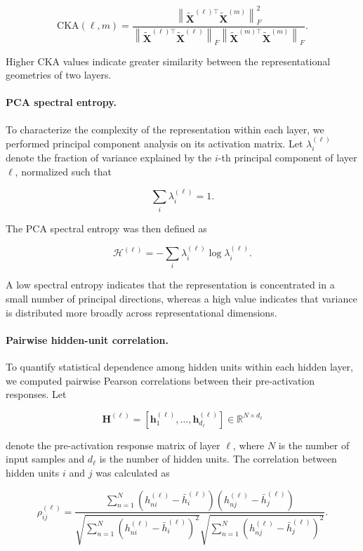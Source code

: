 \documentclass{article}
\begin{document}
\[
\mathrm{CKA}(\ell,m)
=
\frac{
\left\|
\tilde{\mathbf{X}}^{(\ell)\top}
\tilde{\mathbf{X}}^{(m)}
\right\|_F^2
}{
\left\|
\tilde{\mathbf{X}}^{(\ell)\top}
\tilde{\mathbf{X}}^{(\ell)}
\right\|_F
\left\|
\tilde{\mathbf{X}}^{(m)\top}
\tilde{\mathbf{X}}^{(m)}
\right\|_F
}.
\]

Higher CKA values indicate greater similarity between the representational geometries of two layers.

\paragraph{PCA spectral entropy.}
To characterize the complexity of the representation within each layer, we performed principal component analysis on its activation matrix. Let $\lambda_i^{(\ell)}$ denote the fraction of variance explained by the $i$-th principal component of layer $\ell$, normalized such that

\[
\sum_i \lambda_i^{(\ell)} = 1.
\]

The PCA spectral entropy was then defined as

\[
\mathcal{H}^{(\ell)}
=
-\sum_i
\lambda_i^{(\ell)}
\log \lambda_i^{(\ell)}.
\]

A low spectral entropy indicates that the representation is concentrated in a small number of principal directions, whereas a high value indicates that variance is distributed more broadly across representational dimensions.

\paragraph{Pairwise hidden-unit correlation.}
To quantify statistical dependence among hidden units within each hidden layer, we computed pairwise Pearson correlations between their pre-activation responses. Let

\[
\mathbf{H}^{(\ell)}
=
\left[
\mathbf{h}^{(\ell)}_1,
\ldots,
\mathbf{h}^{(\ell)}_{d_\ell}
\right]
\in
\mathbb{R}^{N\times d_\ell}
\]

denote the pre-activation response matrix of layer $\ell$, where $N$ is the number of input samples and $d_\ell$ is the number of hidden units. The correlation between hidden units $i$ and $j$ was calculated as

\[
\rho_{ij}^{(\ell)}
=
\frac{
\sum_{n=1}^{N}
\left(h_{ni}^{(\ell)}-\bar{h}_{i}^{(\ell)}\right)
\left(h_{nj}^{(\ell)}-\bar{h}_{j}^{(\ell)}\right)
}{
\sqrt{
\sum_{n=1}^{N}
\left(h_{ni}^{(\ell)}-\bar{h}_{i}^{(\ell)}\right)^2
}
\sqrt{
\sum_{n=1}^{N}
\left(h_{nj}^{(\ell)}-\bar{h}_{j}^{(\ell)}\right)^2
}
}.
\]
\end{document}
